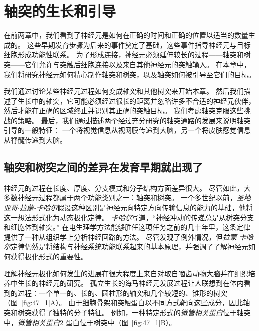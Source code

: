 \chapter{轴突的生长和引导} \label{chap:chap47}


在前两章中，我们看到了神经元是如何在正确的时间和正确的位置以适当的数量生成的。
这些早期发育步骤为后来的事件奠定了基础，这些事件指导神经元与目标细胞形成功能性联系。
为了形成连接，神经元必须延伸较长的过程——轴突和树突——它们允许与突触后细胞连接以及来自其他神经元的突触输入。
在本章中，我们将研究神经元如何精心制作轴突和树突，以及轴突如何被引导至它们的目标。


我们通过讨论某些神经元过程如何变成轴突和其他树突来开始本章。
然后我们描述了生长中的轴突，它可能必须经过很长的距离并忽略许多不合适的神经元伙伴，然后才能在正确的区域终止并识别其正确的突触目标。
我们考虑轴突克服这些挑战的策略。
最后，我们通过描述两个经过充分研究的轴突通路的发展来说明轴突引导的一般特征：
一个将视觉信息从视网膜传递到大脑，另一个将皮肤感觉信息从脊髓传递到大脑。



\section{轴突和树突之间的差异在发育早期就出现了}

神经元的过程在长度、厚度、分支模式和分子结构方面差异很大。
尽管如此，大多数神经元过程都属于两个功能类别之一：轴突和树突。
一个多世纪以前，\textit{圣地亚哥$\cdot$拉蒙-卡哈尔}假设这种区别是神经元向特定方向传输信息的能力的基础，他将这一想法形式化为动态极化定律。
\textit{卡哈尔}写道，“神经冲动的传递总是从树突分支和细胞体到轴突。” 
在电生理学方法能够胜任这项任务之前的几十年里，这条定律提供了一种从组织学上分析神经回路的方法。
尽管发现了例外情况，但\textit{拉蒙-卡哈尔}定律仍然是将结构与神经系统功能联系起来的基本原理，并强调了了解神经元如何获得极化形式的重要性。


理解神经元极化如何发生的进展在很大程度上来自对取自啮齿动物大脑并在组织培养中生长的神经元的研究。
孤立生长的海马神经元发展过程让人联想到在体内看到的过程：一个单一的、长的、圆柱形的轴突和几个较短的、锥形的树突（图~\ref{fig:47_1}A）。
由于细胞骨架和突触蛋白以不同方式靶向这些成分，因此轴突和树突获得了独特的分子特征。
例如，一种特定形式的\textit{微管相关蛋白}位于轴突中，\textit{微管相关蛋白}2 蛋白位于树突中（图~\ref{fig:47_1}B）。


